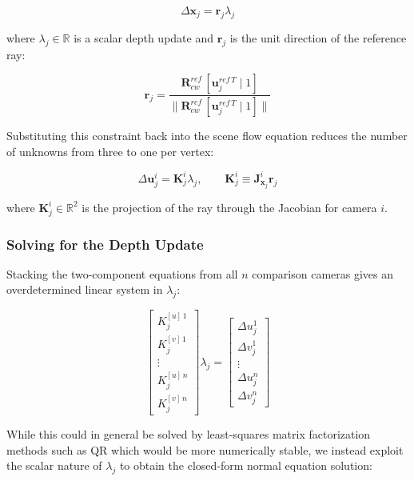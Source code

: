 \documentclass[10pt,twocolumn]{article}
\begin{document}
\begin{equation}
    \Delta\mathbf{x}_j = \mathbf{r}_j \lambda_j
\end{equation}

where $\lambda_j \in \mathbb{R}$ is a scalar depth update and $\mathbf{r}_j$ is the unit direction of the reference ray:

\begin{equation}
    \mathbf{r}_j = \frac{\mathbf{R}^{ref}_{cw} \, [\mathbf{u}^{ref\,T}_j \mid 1]}{\|\mathbf{R}^{ref}_{cw} \, [\mathbf{u}^{ref\,T}_j \mid 1]\|}
\end{equation}

Substituting this constraint back into the scene flow equation reduces the number of unknowns from three to one per vertex:

\begin{equation}
    \Delta\mathbf{u}^i_j = \mathbf{K}^i_j \lambda_j, \qquad \mathbf{K}^i_j \equiv \mathbf{J}^i_{\mathbf{x}_j} \mathbf{r}_j
\end{equation}

where $\mathbf{K}^i_j \in \mathbb{R}^2$ is the projection of the ray through the Jacobian for camera $i$.

\subsubsection{Solving for the Depth Update}

Stacking the two-component equations from all $n$ comparison cameras gives an overdetermined linear system in $\lambda_j$:

\begin{equation}
    \begin{bmatrix} K^{[u]\,1}_j \\ K^{[v]\,1}_j \\ \vdots \\ K^{[u]\,n}_j \\ K^{[v]\,n}_j \end{bmatrix} \lambda_j
    =
    \begin{bmatrix} \Delta u^1_j \\ \Delta v^1_j \\ \vdots \\ \Delta u^n_j \\ \Delta v^n_j \end{bmatrix}
\end{equation}

While this could in general be solved by least-squares matrix factorization methods such as QR which would be more numerically stable, we instead exploit the scalar nature of $\lambda_j$ to obtain the closed-form normal equation solution:
\end{document}
